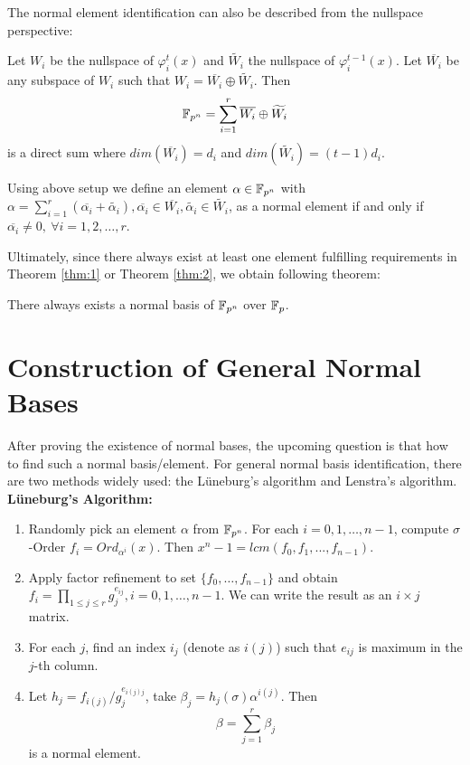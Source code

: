 The normal element identification can also be described from the nullspace perspective:
\begin{Theorem}
\label{thm:2}
Let $W_i$ be the nullspace of $\varphi_{i}^{t} (x)$ and $\widetilde{W_i}$ the
nullspace of $\varphi_{i}^{t-1} (x)$. Let $\overline{W_i}$ be any subspace of
$W_i$ such that $W_i = \overline{W_i}\oplus \widetilde{W_i}$. Then
$${\mathbb{F}}_{p^n} = \displaystyle\sum_{i=1}^{r} \overline{W_i}\oplus \widetilde{W_i}$$
is a direct sum where $dim(\overline{W_i}) = d_i$ and $dim(\widetilde{W_i}) = (t-1)d_i$.

Using above setup we define an element $\alpha \in {\mathbb{F}}_{p^n}$ with 
$\alpha = \sum_{i=1}^{r} (\overline{\alpha_i} + \widetilde{\alpha_i}), \overline{\alpha_i} \in \overline{W_i}, \widetilde{\alpha_i} \in \widetilde{W_i}$,
as a normal element if and only if $\overline{\alpha_i} \neq 0,~ \forall i = 1,2,\dots,r$.
\end{Theorem}

Ultimately, since there always exist at least one element fulfilling requirements in Theorem \ref{thm:1}
or Theorem \ref{thm:2}, we obtain following theorem:
\begin{Theorem}
There always exists a normal basis of ${\mathbb{F}}_{p^n}$ over ${\mathbb{F}}_p$.
\end{Theorem}
\section{Construction of General Normal Bases}
After proving the existence of normal bases, the upcoming question is that how to find such a normal basis/element.
For general normal basis identification, there are two methods widely used: the L\"uneburg's algorithm
and Lenstra's algorithm.\\
\textbf{L\"uneburg's Algorithm:}
\begin{enumerate}[{1)}]
\item Randomly pick an element $\alpha$ from ${\mathbb{F}}_{p^n}$. For each $i = 0,1,\dots,n-1$, 
compute $\sigma$-Order $f_i = Ord_{\alpha^i}(x)$. Then $x^n - 1 = lcm(f_0,f_1,...,f_{n-1})$.
\item Apply factor refinement to set $\{f_0,\dots,f_{n-1}\}$ and obtain $f_i = \prod_{1\leq j\leq r} g_{j}^{e_{ij}}, i = 0,1,\dots,n-1$.
We can write the result as an $i\times j$ matrix.
\item For each $j$, find an index $i_j$ (denote as $i(j)$) such that $e_{ij}$ is maximum in the $j$-th column.
\item Let $h_j = f_{i(j)}/g_{j}^{e_{i(j)j}}$, take $\beta_j = h_j(\sigma)\alpha^{i(j)}$. Then
$$\beta = \displaystyle\sum_{j=1}^{r} \beta_j$$
is a normal element.
\end{enumerate}


